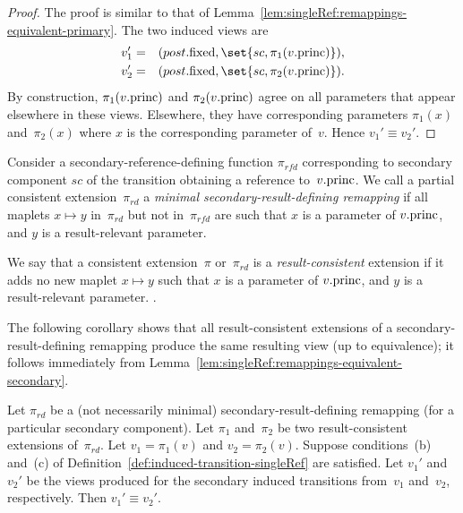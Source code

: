 \begin{proof}
The proof is similar to that of
Lemma~\ref{lem:singleRef:remappings-equivalent-primary}.  The two induced
views are
\begin{eqnarray*}
v_1' & = & (post.\fixed, \set{sc, \pi_1(v.\princ)}), \\
v_2' & = & (post.\fixed, \set{sc, \pi_2(v.\princ)}).
\end{eqnarray*}
%
By construction, $\pi_1(v.\mathrm{princ})$ and $\pi_2(v.\mathrm{princ})$ agree on all
parameters that appear elsewhere in these views.  Elsewhere, they have
corresponding parameters $\pi_1(x)$ and~$\pi_2(x)$ where $x$ is the
corresponding parameter of~$v$.  Hence $v_1' \equiv v_2'$.
\end{proof}


\begin{definition}
Consider a secondary-reference-defining function $\pi_{rfd}$ corresponding to
secondary component $sc$ of the transition obtaining a reference
to~$v.\mathrm{princ}$.  We call a partial consistent extension~$\pi_{rd}$ a
\emph{minimal secondary-result-defining remapping} if all maplets $x \mapsto y$
in~$\pi_{rd}$ but not in~$\pi_{rfd}$ are such that $x$ is a parameter of
$v.\mathrm{princ}$, and $y$ is a result-relevant parameter.

We say that a consistent extension~$\pi$ or~$\pi_{rd}$ is a
\emph{result-consistent} extension if it adds no new 
%
maplet $x \mapsto y$ such that $x$ is a parameter of
$v.\mathrm{princ}$, and $y$ is a result-relevant parameter.
%
.
\end{definition}


The following corollary shows that all result-consistent extensions of a
secondary-result-defining remapping produce the same resulting view (up to
equivalence); it follows immediately from
Lemma~\ref{lem:singleRef:remappings-equivalent-secondary}.
%
\begin{corollary}
Let $\pi_{rd}$ be a (not necessarily minimal) secondary-result-defining
remapping (for a particular secondary component).  Let $\pi_1$ and~$\pi_2$ be
two result-consistent extensions of~$\pi_{rd}$.  Let $v_1 = \pi_1(v)$ and $v_2
= \pi_2(v)$.  Suppose conditions~(b) and~(c) of
Definition~\ref{def:induced-transition-singleRef} are satisfied.  Let $v_1'$
and $v_2'$ be the views produced for the secondary induced transitions
from~$v_1$ and~$v_2$, respectively.  Then $v_1' \equiv v_2'$.
\end{corollary}
